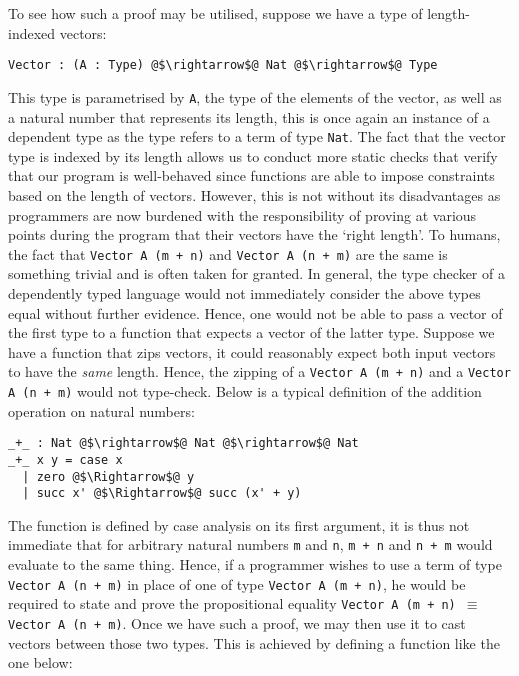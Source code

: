 \documentclass[12pt,twoside,maitrise]{dms}
\theoremstyle{definition}
\numberwithin{equation}{section}
\numberwithin{table}{chapter}
\numberwithin{figure}{chapter}
\newcommand\fn[1] {\texttt{#1}}
\begin{document}
To see how such a proof may be utilised, suppose we have a type of
length-indexed vectors:

\begin{verbatim}
Vector : (A : Type) @$\rightarrow$@ Nat @$\rightarrow$@ Type
\end{verbatim}

This type is parametrised by \fn{A}, the type of the elements of the vector, as
well as a natural number that represents its length, this is once again an
instance of a dependent type as the type refers to a term of type \fn{Nat}. The
fact that the vector type is indexed by its length allows us to conduct more
static checks that verify that our program is well-behaved since functions are
able to impose constraints based on the length of vectors. However, this is not
without its disadvantages as programmers are now burdened with the
responsibility of proving at various points during the program that their
vectors have the `right length'. To humans, the fact that \fn{Vector A (m + n)}
and \fn{Vector A (n + m)} are the same is something trivial and is often taken
for granted. In general, the type checker of a dependently typed language would
not immediately consider the above types equal without further evidence. Hence,
one would not be able to pass a vector of the first type to a function that
expects a vector of the latter type. Suppose we have a function that zips
vectors, it could reasonably expect both input vectors to have the \emph{same}
length. Hence, the zipping of a \fn{Vector A (m + n)} and a \fn{Vector A (n +
  m)} would not type-check. Below is a typical definition of the addition
operation on natural numbers:

\begin{verbatim}
_+_ : Nat @$\rightarrow$@ Nat @$\rightarrow$@ Nat
_+_ x y = case x
  | zero @$\Rightarrow$@ y
  | succ x' @$\Rightarrow$@ succ (x' + y)
\end{verbatim}

The function is defined by case analysis on its first argument, it is thus not
immediate that for arbitrary natural numbers \fn{m} and \fn{n}, \fn{m + n} and
\fn{n + m} would evaluate to the same thing. Hence, if a programmer wishes to
use a term of type \fn{Vector A (n + m)} in place of one of type \fn{Vector A
  (m + n)}, he would be required to state and prove the propositional equality
\fn{Vector A (m + n) $\equiv$ Vector A (n + m)}. Once we have such a proof, we
may then use it to cast vectors between those two types. This is achieved by
defining a function like the one below:
\end{document}
